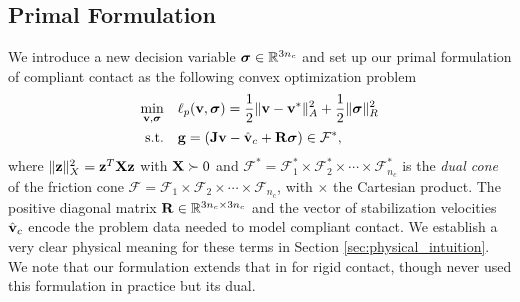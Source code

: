 \subsection{Primal Formulation}
\label{sec:primal_formulation}

We introduce a new decision variable ${\bm{\sigma}}\in\mathbb{R}^{3n_c}$ and set
up our primal formulation of compliant contact as the following convex
optimization problem
\begin{equation}
	\begin{aligned}
	\min_{\mf{v},\bsigma} \quad & \ell_p(\mf{v},\bsigma) =
	\frac{1}{2}\Vert\mf{v}-\mf{v}^*\Vert_{A}^2 +
	\frac{1}{2} \Vert\bsigma\Vert_{R}^2\\
	\textrm{s.t.} \quad & \mf{g} = (\mf{J}\mf{v}-\hat{\mf{v}}_c + \mf{R}\bsigma) \in \mathcal{F}^*,\\
	\end{aligned}
	\label{eq:primal_regularized}
\end{equation}
where $\Vert{\mathbf{z}}\Vert_X^2={\mathbf{z}}^T{\mathbf{X}}{\mathbf{z}}$ with ${\mathbf{X}}\succ 0$ and
$\mathcal{F^*}= \mathcal{F}^*_1 \times \mathcal{F}^*_2 \times \cdots \times
\mathcal{F}^*_{n_c}$ is the \emph{dual cone} of the friction cone $\mathcal{F} =
\mathcal{F}_1 \times \mathcal{F}_2 \times \cdots \times \mathcal{F}_{n_c}$, with
$\times$ the Cartesian product. The positive diagonal matrix
${\mathbf{R}}\in\mathbb{R}^{3n_c\times 3n_c}$ and the vector of stabilization
velocities $\hat{{\mathbf{v}}}_c$ encode the problem data needed to model compliant
contact. We establish a very clear physical meaning for these terms in Section
\ref{sec:physical_intuition}. We note that our formulation extends that in
\cite{bib:mazhar2014} for rigid contact, though \cite{bib:mazhar2014} never used
this formulation in practice but its dual.

